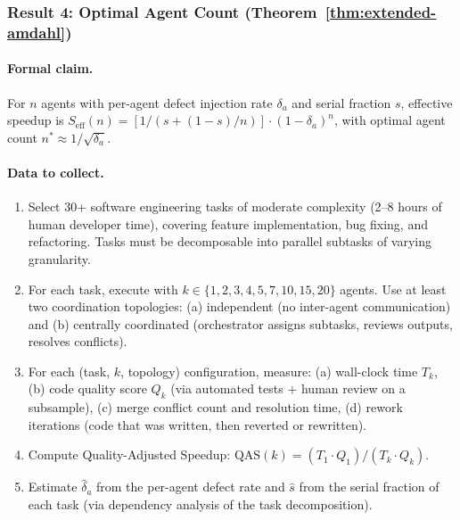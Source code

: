 \documentclass[11pt, a4paper, logo, copyright]{googledeepmind}
\begin{document}
\subsubsection{Result 4: Optimal Agent Count (Theorem~\ref{thm:extended-amdahl})}

\paragraph{Formal claim.} For $n$ agents with per-agent defect injection rate $\delta_a$ and serial fraction $s$, effective speedup is $S_{\text{eff}}(n) = [1/(s + (1-s)/n)] \cdot (1-\delta_a)^n$, with optimal agent count $n^* \approx 1/\sqrt{\delta_a}$.

\paragraph{Data to collect.}
\begin{enumerate}[nosep]
    \item Select 30+ software engineering tasks of moderate complexity (2--8 hours of human developer time), covering feature implementation, bug fixing, and refactoring. Tasks must be decomposable into parallel subtasks of varying granularity.
    \item For each task, execute with $k \in \{1, 2, 3, 4, 5, 7, 10, 15, 20\}$ agents. Use at least two coordination topologies: (a) independent (no inter-agent communication) and (b) centrally coordinated (orchestrator assigns subtasks, reviews outputs, resolves conflicts).
    \item For each (task, $k$, topology) configuration, measure: (a) wall-clock time $T_k$, (b) code quality score $Q_k$ (via automated tests + human review on a subsample), (c) merge conflict count and resolution time, (d) rework iterations (code that was written, then reverted or rewritten).
    \item Compute Quality-Adjusted Speedup: $\text{QAS}(k) = (T_1 \cdot Q_1) / (T_k \cdot Q_k)$.
    \item Estimate $\hat{\delta}_a$ from the per-agent defect rate and $\hat{s}$ from the serial fraction of each task (via dependency analysis of the task decomposition).
\end{enumerate}
\end{document}
